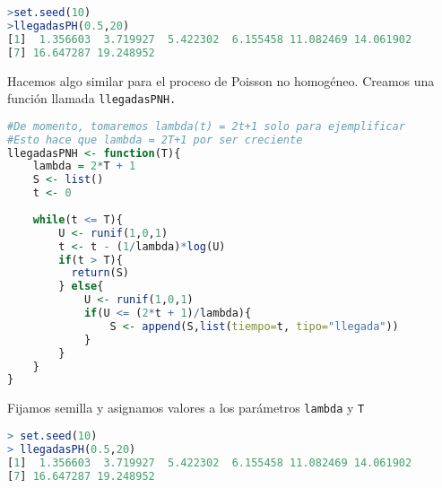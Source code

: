 \documentclass[12pt,letterpaper]{article}
\begin{document}
\begin{lstlisting}[language=R]
>set.seed(10)
>llegadasPH(0.5,20)
[1]  1.356603  3.719927  5.422302  6.155458 11.082469 14.061902
[7] 16.647287 19.248952
\end{lstlisting}

Hacemos algo similar para el proceso de Poisson no homogéneo. Creamos una función llamada \texttt{llegadasPNH.}

\begin{lstlisting}[language=R]
#De momento, tomaremos lambda(t) = 2t+1 solo para ejemplificar
#Esto hace que lambda = 2T+1 por ser creciente     
llegadasPNH <- function(T){
	lambda = 2*T + 1
	S <- list()
	t <- 0
	
	while(t <= T){
		U <- runif(1,0,1)
		t <- t - (1/lambda)*log(U)
		if(t > T){
		  return(S)
		} else{
			U <- runif(1,0,1)
			if(U <= (2*t + 1)/lambda){
				S <- append(S,list(tiempo=t, tipo="llegada"))
			}
		}
	}
}

\end{lstlisting}
Fijamos semilla y asignamos valores a los parámetros \texttt{lambda} y \texttt{T}

\begin{lstlisting}[language=R]
> set.seed(10)
> llegadasPH(0.5,20)
[1]  1.356603  3.719927  5.422302  6.155458 11.082469 14.061902
[7] 16.647287 19.248952

\end{lstlisting}
\end{document}
